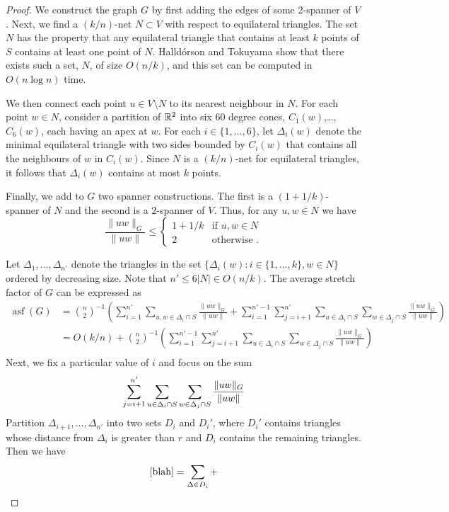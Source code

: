 \documentclass{patmorin}
\DeclareMathOperator{\asf}{asf}
\begin{document}
\begin{proof}
  We construct the graph $G$ by first adding the edges of some 2-spanner
  of $V$.  Next, we find a $(k/n)$-net $N\subset V$ with respect to
  equilateral triangles. The set $N$ has the property that any equilateral
  triangle that contains at least $k$ points of $S$ contains at least
  one point of $N$.  Halld\'orson and Tokuyama show that there exists
  such a set, $N$, of size $O(n/k)$, and this set can be computed in
  $O(n\log n)$ time.

  We then connect each point $u\in V\setminus N$ to its nearest neighbour
  in $N$.  For each point $w\in N$, consider a partition of $\mathbb{R}^2$
  into six 60 degree cones, $C_1(w)$,\ldots,$C_6(w)$, each having an
  apex at $w$.  For each $i\in \{1,\ldots,6\}$, let $\Delta_i(w)$ denote
  the minimal equilateral triangle with two sides bounded by $C_i(w)$
  that contains all the neighbours of $w$ in $C_i(w)$.  Since $N$ is a
  $(k/n)$-net for equilateral triangles, it follows that $\Delta_i(w)$ 
  contains at most $k$ points.

  Finally, we add to $G$ two spanner constructions.  The first is a
  $(1+1/k)$-spanner of $N$ and the second is a $2$-spanner of $V$.
  Thus, for any $u,w\in N$ we have
  \[
     \frac{\|uw\|_G}{\|uw\|} \le \begin{cases}
           1+1/k & \text{if $u,w\in N$} \\
           2 & \text{otherwise .}
         \end{cases}
  \]

  Let $\Delta_1,\ldots,\Delta_{n'}$ denote the triangles in the set
  $\{\Delta_i(w):i\in\{1,\ldots,k\}, w\in N\}$ ordered by decreasing size.
  Note that $n'\le 6|N|\in O(n/k)$.  The average stretch factor of $G$
  can be expressed as
  \begin{align*}
    \asf(G) & = 
         \binom n2^{-1}\left(\sum_{i=1}^{n'}\sum_{u,w\in\Delta_i\cap S}\frac{\|uw\|_G}{\|uw\|}  
             + \sum_{i=1}^{n'-1}\sum_{j={i+1}}^{n'}\sum_{u\in\Delta_i\cap S}\sum_{w\in\Delta_j\cap S}\frac{\|uw\|_G}{\|uw\|}\right)  \\
      & = 
         O(k/n) + \binom n2^{-1}\left(  
             \sum_{i=1}^{n'-1}\sum_{j={i+1}}^{n'}\sum_{u\in\Delta_i\cap S}\sum_{w\in\Delta_j\cap S}\frac{\|uw\|_G}{\|uw\|}\right)  \\
   \end{align*}
   Next, we fix a particular value of $i$ and focus on the sum
   \begin{equation}
       \sum_{j={i+1}}^{n'}
          \sum_{u\in\Delta_i\cap S}
          \sum_{w\in\Delta_j\cap S}\frac{\|uw\|_G}{\|uw\|}
          \eqlabel{blah}
   \end{equation}
   Partition $\Delta_{i+1},\ldots,\Delta_{n'}$ into two sets $D_i$ and
   $D_i'$, where $D_i'$ contains triangles whose distance from $\Delta_i$
   is greater than $r$ and $D_i$ contains the remaining triangles.
   Then we have
   \begin{align*}
     \eqref{blah} = \sum_{\Delta\in D_i} + 
   \end{align*}
\end{proof}
\end{document}
